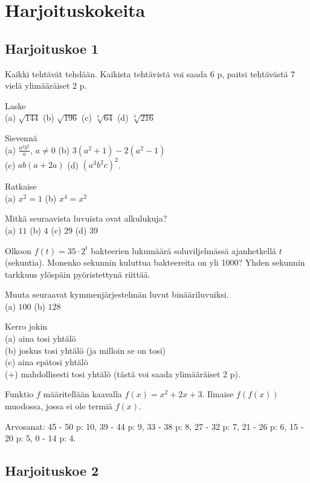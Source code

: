 \chapter{Harjoituskokeita}

\section*{Harjoituskoe 1}

\begin{description}
	\item Kaikki tehtävät tehdään. Kaikista tehtävistä voi saada 6 p, paitsi tehtävästä 7 vielä ylimääräiset 2 p.
	\item[1.] Laske \\
	(a) $\sqrt{144}$ \qquad
	(b) $\sqrt{196}$ \qquad
	(c) $\sqrt[3]{64}$ \qquad
	(d) $\sqrt[3]{216}$
	\item[2.] Sievennä \\
	(a) $\frac{a^2 b^2}{a}$, $a \neq 0$ \qquad
	(b) $3(a^2+1)-2(a^2-1)$ \\
	(c) $ab(a+2a)$ \qquad
	(d) $(a^3 b^2 c)^2$.
	\item[3.] Ratkaise \\
	(a) $x^2 = 1$
	(b) $x^4 = x^2$
	\item[4.] Mitkä seuraavista luvuista ovat alkulukuja? \\
	(a) $11$ \qquad
	(b) $4$ \qquad
	(c) $29$ \qquad
	(d) $39$
	\item[5.] Olkoon $f(t) = 35 \cdot 2^t$ bakteerien lukumäärä soluviljelmässä ajanhetkellä $t$ (sekuntia). Monenko sekunnin kuluttua bakteereita on yli 1000? Yhden sekunnin tarkkuus ylöspäin pyöristettynä riittää.
	\item[6.] Muuta seuraavat kymmenjärjestelmän luvut binääriluvuiksi. \\
	(a) $100$ \qquad
	(b) $128$
	\item[7.] Kerro jokin \\
	(a) aina tosi yhtälö \\
	(b) joskus tosi yhtälö (ja milloin se on tosi) \\
	(c) aina epätosi yhtälö \\
	(+) mahdollisesti tosi yhtälö (tästä voi saada ylimääräiset 2 p).
	\item[8.] Funktio $f$ määritellään kaavalla $f(x) = x^2 + 2x + 3$. Ilmaise $f(f(x))$ muodossa, jossa ei ole termiä $f(x)$.
	\item Arvosanat: 45 - 50 p: 10, 39 - 44 p: 9, 33 - 38 p: 8, 27 - 32 p: 7, 21 - 26 p: 6, 15 - 20 p: 5, 0 - 14 p: 4.
\end{description}

\section*{Harjoituskoe 2}

